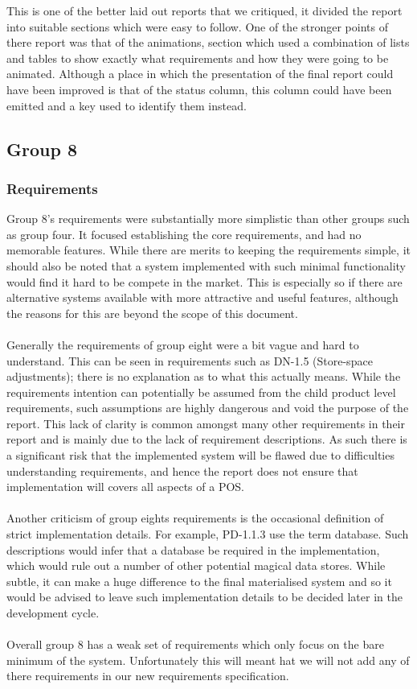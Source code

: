 \documentclass[a4paper]{article}
\begin{document}
This is one of the better laid out reports that we critiqued, it divided the report into suitable sections which were easy to follow. One of the stronger points of there report was that of the animations, section which used a combination of lists and tables to show exactly what requirements and how they were going to be animated. 
Although a place in which the presentation of the final report could have been improved is that of the status column, this column could have been emitted and a key used to identify them instead. 





\pagebreak
\subsection{Group 8}
\subsubsection{Requirements}
Group 8's requirements were substantially more simplistic than other groups such as group four. It focused establishing the core requirements, and had no memorable features. While there are merits to keeping the requirements simple, it should also be noted that a system implemented with such minimal functionality would find it hard to be compete in the market. This is especially so if there are alternative systems available with more attractive and useful features, although the reasons for this are beyond the scope of this document.
\\\\
Generally the requirements of group eight were a bit vague and hard to understand. This can be seen in requirements such as DN-1.5 (Store-space adjustments); there is no explanation as to what this actually means. While the requirements intention can potentially be assumed from the child product level requirements, such assumptions are highly dangerous and void the purpose of the report. This lack of clarity is common amongst many other requirements in their report and is mainly due to the lack of requirement descriptions. As such there is a significant risk that the implemented system will be flawed due to difficulties understanding requirements, and hence the report does not ensure that implementation will covers all aspects of a POS. 
\\\\
Another criticism of group eights requirements is the occasional definition of strict implementation details. For example, PD-1.1.3 use the term database. Such descriptions would infer that a database be required in the implementation, which would rule out a number of other potential magical data stores. While subtle, it can make a huge difference to the final materialised system and so it would be advised to leave such implementation details to be decided later in the development cycle.
\\\\
Overall group 8 has a weak set of requirements which only focus on the bare minimum of the system. Unfortunately this will meant hat we will not add any of there requirements in our new requirements specification. 
\\\\
\end{document}
